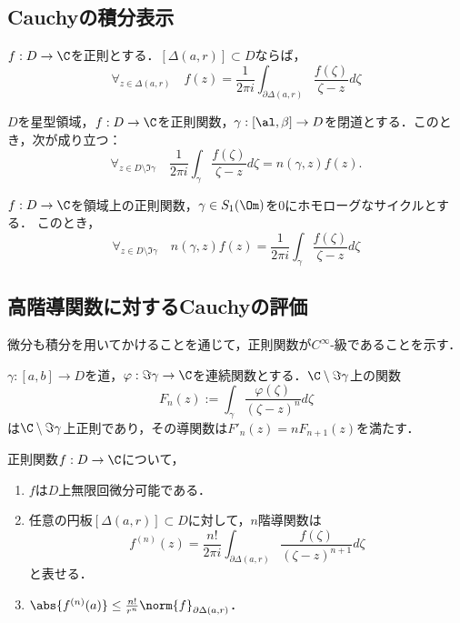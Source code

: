 \documentclass[uplatex, dvipdfmx]{jsreport}
\begin{document}
\subsection{Cauchyの積分表示}

\begin{theorem}[閉円板に対するCauchyの積分表示]
    $f:D\to\C$を正則とする．$[\Delta(a,r)]\subset D$ならば，
    \[\forall_{z\in\Delta(a,r)}\quad f(z)=\frac{1}{2\pi i}\int_{\partial\Delta(a,r)}\frac{f(\zeta)}{\zeta-z}d\zeta\]
\end{theorem}

\begin{theorem}[一般の曲線に対するCauchyの積分表示]
    $D$を星型領域，$f:D\to\C$を正則関数，$\gamma:[\al,\beta]\to D$を閉道とする．このとき，次が成り立つ：
    \[\forall_{z\in D\setminus\Im\gamma}\quad\frac{1}{2\pi i}\int_\gamma\frac{f(\zeta)}{\zeta-z}d\zeta=n(\gamma,z)f(z).\]
\end{theorem}

\begin{theorem}[ホモロジーの言葉によるCauchyの積分表示]\label{thm-Cauchy-representation}
    $f:D\to\C$を領域上の正則関数，$\gamma\in S_1(\Om)$を$0$にホモローグなサイクルとする．
    このとき，
    \[\forall_{z\in D\setminus\Im\gamma}\quad n(\gamma,z)f(z)=\frac{1}{2\pi i}\int_\gamma\frac{f(\zeta)}{\zeta-z}d\zeta\]
\end{theorem}

\subsection{高階導関数に対するCauchyの評価}

\begin{tcolorbox}[colframe=ForestGreen, colback=ForestGreen!10!white,breakable,colbacktitle=ForestGreen!40!white,coltitle=black,fonttitle=\bfseries\sffamily,
title=]
    微分も積分を用いてかけることを通じて，正則関数が$C^\infty$-級であることを示す．
\end{tcolorbox}

\begin{lemma}
    $\gamma:[a,b]\to D$を道，$\varphi:\Im\gamma\to\C$を連続関数とする．$\C\setminus\Im\gamma$上の関数
    \[F_n(z):=\int_\gamma\frac{\varphi(\zeta)}{(\zeta-z)^n}d\zeta\]
    は$\C\setminus\Im\gamma$上正則であり，その導関数は$F'_n(z)=nF_{n+1}(z)$を満たす．
\end{lemma}

\begin{theorem}\label{thm-Cauchy-evaluation}
    正則関数$f:D\to\C$について，
    \begin{enumerate}
        \item $f$は$D$上無限回微分可能である．
        \item 任意の円板$[\Delta(a,r)]\subset D$に対して，$n$階導関数は
        \[f^{(n)}(z)=\frac{n!}{2\pi i}\int_{\partial\Delta(a,r)}\frac{f(\zeta)}{(\zeta-z)^{n+1}}d\zeta\]
        と表せる．
        \item $\abs{f^{(n)}(a)}\le\frac{n!}{r^n}\norm{f}_{\partial\Delta(a,r)}$．
    \end{enumerate}
\end{theorem}
\end{document}
